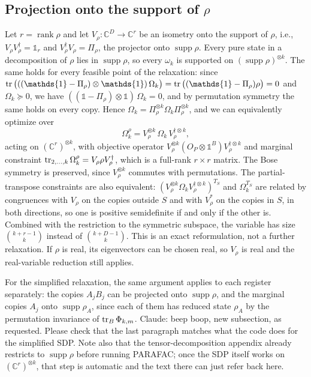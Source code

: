 \documentclass[aps,pra,twocolumn,showpacs,superscriptaddress,groupedaddress]{revtex4-2}
\newcommand{\one}[0]{\mathds{1}}
\newcommand{\claude}[1]{{\color{claudeorange} Claude: beep boop, #1}}
\newcommand{\C}{\mathds{C}}
\newcommand{\I}{\one}
\begin{document}
\begin{widetext}
\subsection{Projection onto the support of $\rho$}\label{app:supportReduction}
Let $r=\operatorname{rank}\rho$ and let $V_\rho:\C^D\to\C^r$ be an isometry onto the support of $\rho$, i.e., $V_\rho V_\rho^\dagger=\I_r$ and $V_\rho^\dagger V_\rho=\Pi_\rho$, the projector onto $\operatorname{supp}\rho$. Every pure state in a decomposition of $\rho$ lies in $\operatorname{supp}\rho$, so every $\omega_k$ is supported on $(\operatorname{supp}\rho)^{\otimes k}$. The same holds for every feasible point of the relaxation: since $\tr\big(((\I-\Pi_\rho)\otimes\I)\,\Omega_k\big)=\tr\big((\I-\Pi_\rho)\rho\big)=0$ and $\Omega_k\succeq0$, we have $((\I-\Pi_\rho)\otimes\I)\,\Omega_k=0$, and by permutation symmetry the same holds on every copy. Hence $\Omega_k=\Pi_\rho^{\otimes k}\Omega_k\Pi_\rho^{\otimes k}$, and we can equivalently optimize over
\begin{equation}
    \Omega_k^\rho=V_\rho^{\otimes k}\,\Omega_k\,V_\rho^{\dagger\otimes k},
\end{equation}
acting on $(\C^r)^{\otimes k}$, with objective operator $V_\rho^{\otimes k}(O_P\otimes\I^B)V_\rho^{\dagger\otimes k}$ and marginal constraint $\tr_{2,\dots,k}\Omega_k^\rho=V_\rho\rho V_\rho^\dagger$, which is a full-rank $r\times r$ matrix. The Bose symmetry is preserved, since $V_\rho^{\otimes k}$ commutes with permutations. The partial-transpose constraints are also equivalent: $(V_\rho^{\otimes k}\Omega_kV_\rho^{\dagger\otimes k})^{T_S}$ and $\Omega_k^{T_S}$ are related by congruences with $V_\rho$ on the copies outside $S$ and with $V_\rho^*$ on the copies in $S$, in both directions, so one is positive semidefinite if and only if the other is. Combined with the restriction to the symmetric subspace, the variable has size $\binom{k+r-1}{k}$ instead of $\binom{k+D-1}{k}$. This is an exact reformulation, not a further relaxation. If $\rho$ is real, its eigenvectors can be chosen real, so $V_\rho$ is real and the real-variable reduction still applies.

For the simplified relaxation, the same argument applies to each register separately: the copies $A_jB_j$ can be projected onto $\operatorname{supp}\rho$, and the marginal copies $A_j$ onto $\operatorname{supp}\rho_A$, since each of them has reduced state $\rho_A$ by the permutation invariance of $\tr_B\Phi_{k,m}$.
\claude{new subsection, as requested. Please check that the last paragraph matches what the code does for the simplified SDP. Note also that the tensor-decomposition appendix already restricts to $\operatorname{supp}\rho$ before running PARAFAC; once the SDP itself works on $(\C^r)^{\otimes k}$, that step is automatic and the text there can just refer back here.}


\end{widetext}
\end{document}
